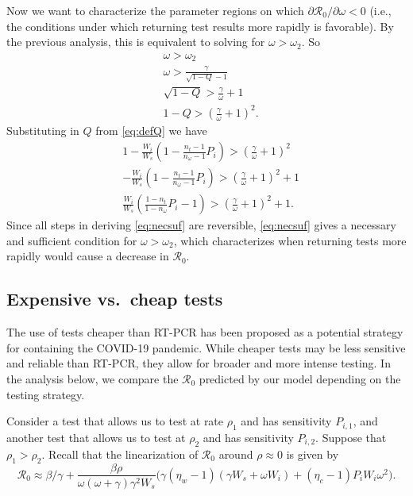 \documentclass[12pt]{article}
\newcommand{\Rnum}{\mathcal{R}_0}
\newcommand{\covid}{COVID-19\xspace}
\theoremstyle{definition} %
\begin{document}
Now we want to characterize the parameter regions on which $\partial{\Rnum}/\partial{\omega} < 0$ (i.e., the conditions under which returning test results more rapidly is favorable). By the previous analysis, this is equivalent to solving for $\omega > \omega_2$. So
\begin{align}
    &\omega > \omega_2 \nonumber \\
    &\omega > \frac{\gamma}{\sqrt{1-Q}-1} \nonumber \\
    &\sqrt{1-Q} > \frac{\gamma}{\omega}+1 \\
    &1-Q > (\frac{\gamma}{\omega}+1)^2.
\end{align}
Substituting in $Q$ from \eqref{eq:defQ} we have
\begin{align}
    &1-\frac{W_i}{W_s}\left(1-\frac{n_{t}-1}{n_{\omega}-1}P_{i}\right)> \left(\frac{\gamma}{\omega}+1\right)^2 \\
    &-\frac{W_i}{W_s}\left(1-\frac{n_{t}-1}{n_{\omega}-1}P_{i}\right)> \left(\frac{\gamma}{\omega}+1\right)^2+1 \\    
    &\frac{W_i}{W_s}\left(\frac{1-n_{t}}{1-n_{\omega}}P_{i}-1\right)> \left(\frac{\gamma}{\omega}+1\right)^2+1\label{eq:necsuf}.
\end{align}
Since all steps in deriving \eqref{eq:necsuf} are reversible, \eqref{eq:necsuf} gives a necessary and sufficient condition for $\omega > \omega_2$, which characterizes when returning tests more rapidly would cause a decrease in $\Rnum$.


\subsection{Expensive vs.\ cheap tests}

The use of tests cheaper than RT-PCR has been proposed as a potential strategy for containing the \covid pandemic. While cheaper tests may be less sensitive and reliable than RT-PCR, they allow for broader and more intense testing. In the analysis below, we compare the $\Rnum$ predicted by our model depending on the testing strategy. 

Consider a test that allows us to test at rate $\rho_1$ and has sensitivity $P_{i,1}$, and another test that allows us to test at $\rho_2$ and has sensitivity $P_{i,2}$. Suppose that $\rho_1 > \rho_2$. Recall that the linearization of $\Rnum$ around $\rho \approx 0$ is given by $$\Rnum \approx \beta/\gamma + \frac{\beta \rho}{\omega (\omega+\gamma) \gamma^2 W_s} \Big(\gamma(\eta_w-1)(\gamma W_s+\omega W_i) + (\eta_c -1)P_iW_i \omega^2 \Big).$$
\end{document}
